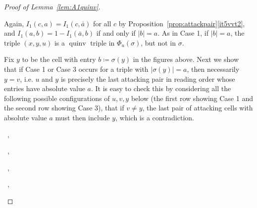 \documentclass[ALCO,Unicode]{cedram}
\DeclareMathOperator{\quinv}{quinv}
\newcommand\cellL[4]{
\def\i{#1} \def\j{#2} \def\entry{#3} \def\labl{#4}
\draw (\j-1,-\i)--(\j,-\i)--(\j,-\i+1)--(\j-1,-\i+1)--(\j-1,-\i);
\node at (\j-.5,-\i+.5) {\entry};
\node at (\j-1.3,-\i+.8) {\tiny\labl};
}
\begin{document}
\begin{proof}[Proof of Lemma~\ref{lem:A1quinv}]
\begin{flushleft}
\end{flushleft}
Again, $I_1(c,a)=I_1(c,\bar{a})$ for all $c$ by Proposition~\ref{prop:attackpair}\ref{it5vvt2}, and $I_1(a,b)=1-I_1(\bar{a},b)$ if and only if $|b|=a$. As in Case 1, if $|b|=a$, the triple $(x,y,u)$ is a $\quinv$ triple in $\Phi_u(\sigma)$, but not in $\sigma$.

Fix $y$ to be the cell with entry $b\coloneqq\sigma(y)$ in the figures above. Next we show that if Case 1 or Case 3 occurs for a triple with $|\sigma(y)|=a$, then necessarily $y=v$, i.e. $u$ and $y$ is precisely the last attacking pair in reading order whose entries have absolute value $a$. It is easy to check this by considering all the following possible configurations of $u,v,y$ below (the first row showing Case 1 and the second row showing Case 3), that if $v\neq y$, the last pair of attacking cells with absolute value $a$ must then include $y$, which is a contradiction.

\begin{center}
\ ,
\quad
{}\ ,
\quad
{}\ ,
\quad
{}
\quad
{}\ ,
\quad
{}
\end{center}


\end{proof}
\end{document}

